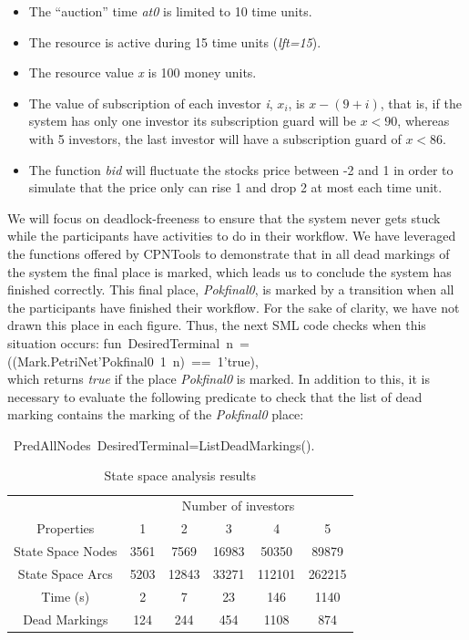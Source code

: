 \begin{itemize}
 \item The ``auction'' time {\em at0} is limited to 10 time units.
 \item The resource is active during 15 time units ({\em lft=15}).
 \item The resource value {\em x} is 100 money units.
 \item The value of subscription of each investor {\em i}, {\em $x_i$}, is $x-(9+i)$, that is, if the system has only one investor its subscription guard will be $x<90$, whereas with 5 investors, the last investor will have a subscription guard of $x<86$.
 \item The function {\it bid} will fluctuate the stocks price between -2 and 1 in order to simulate that the price only can rise 1 and drop 2 at most each time unit. 
\end{itemize}
We will focus on deadlock-freeness to ensure that the
system never gets stuck while the participants have activities to do
in their workflow. We have leveraged the functions offered by CPNTools
to demonstrate that in all dead markings of the system the final
place is marked, which leads us to conclude the system has finished
correctly. This final place, {\em Pokfinal0}, is marked by a transition when all the participants have finished their workflow. For the sake of clarity, we have not drawn this place in each figure. Thus, the next SML code checks when this situation
occurs: \mbox{{\small{fun DesiredTerminal n =((Mark.PetriNet'Pokfinal0
1 n) ==
1'true)}}}, \\
which returns {\em true} if the place {\it Pokfinal0} is marked. In
addition to this, it is necessary to evaluate the following predicate
to check that the list of
dead marking contains the marking of the {\em Pokfinal0} place:
\begin{center}
\mbox{{{  PredAllNodes
DesiredTerminal=ListDeadMarkings()}}}. 
\end{center}
\begin{table} [htp]
\centering
\footnotesize{
\begin{tabular}{|c|c|c|c|c|c|}
  \hline
     & \multicolumn{5}{c|}{Number of investors}\\\cline{2-6}%
  Properties     & 1 & 2 & 3 & 4 & 5 \\ \hline
  State Space Nodes & 3561  & 7569 & 16983 & 50350 & 89879 \\
  State Space Arcs & 5203 & 12843 & 33271  & 112101 &262215 \\
  Time (s) & 2 & 7 & 23 & 146 &  1140\\
  Dead Markings & 124 & 244  & 454  & 1108 &  874 \\
  \hline
\end{tabular}
}
\vspace{-0.2cm}
\caption{State space analysis results}
\label{state_space}
\end{table}
